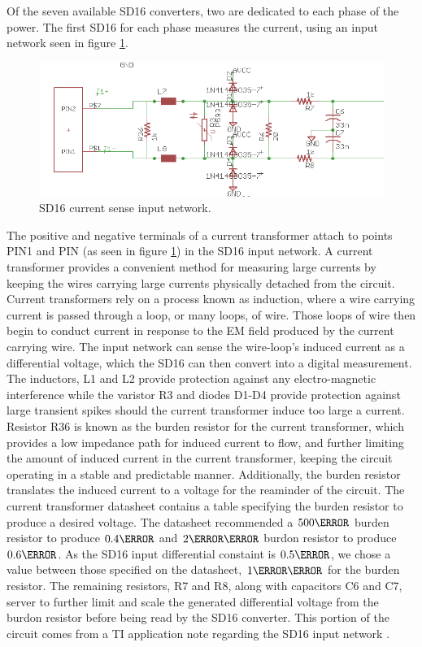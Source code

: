 Of the seven available SD16 converters, two are dedicated to each phase of the power. The first SD16 for each phase measures the current, using an input network seen in figure \ref{fig:sd16_current_sense_input}.
\begin{figure}[htbp]
\begin{center}
\includegraphics[width=6in]{includes/emeterhw/current_sense_eagle_schem}
\caption{SD16 current sense input network.}
\label{fig:sd16_current_sense_input}
\end{center}
\end{figure}
The positive and negative terminals of a current transformer attach to points PIN1 and PIN (as seen in figure \ref{fig:sd16_current_sense_input}) in the SD16 input network. A current transformer provides a convenient method for measuring large currents by keeping the wires carrying large currents physically detached from the circuit. Current transformers rely on a process known as induction, where a wire carrying current is passed through a loop, or many loops, of wire. Those loops of wire then begin to conduct current in response to the \ac{EM} field produced by the current carrying wire. The input network can sense the wire-loop's induced current as a differential voltage, which the SD16 can then convert into a digital measurement. The inductors, L1 and L2 provide protection against any electro-magnetic interference while the varistor R3 and diodes D1-D4 provide protection against large transient spikes should the current transformer induce too large a current. Resistor R36 is known as the burden resistor for the current transformer, which provides a low impedance path for induced current to flow, and further limiting the amount of induced current in the current transformer, keeping the circuit operating in a stable and predictable manner. Additionally, the burden resistor translates the induced current to a voltage for the reaminder of the circuit. The current transformer datasheet \cite{CST1020} contains a table specifying the burden resistor to produce a desired voltage. The datasheet recommended a $500\ohm$ burden resistor to produce $0.4\volt$ and $2\kilo\ohm$ burdon resistor to produce $0.6\volt$. As the SD16 input differential constaint is $0.5\volt$, we chose a value between those specified on the datasheet, $1\kilo\ohm$ for the burden resistor. The remaining resistors, R7 and R8, along with capacitors C6 and C7, server to further limit and scale the generated differential voltage from the burdon resistor before being read by the SD16 converter. This portion of the circuit comes from a \ac{TI} application note regarding the SD16 input network \cite{slaa409}.

